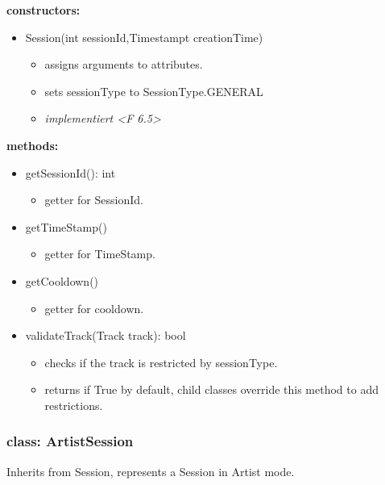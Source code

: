 \documentclass[oneside, ngerman]{sdqtechreport}
\begin{document}
\textbf{constructors:}
\begin{itemize}
    \item Session(int sessionId,Timestampt creationTime)
    \begin{itemize}
        \item assigns arguments to attributes.
        \item sets sessionType to SessionType.GENERAL
        \item \textit{implementiert <F 6.5>}
    \end{itemize}
\end{itemize}
\textbf{methods:}
\begin{itemize}
    \item getSessionId(): int
    \begin{itemize}
        \item getter for SessionId.
    \end{itemize}
    \item getTimeStamp()
    \begin{itemize}
        \item getter for TimeStamp.
    \end{itemize}
    \item getCooldown()
    \begin{itemize}
        \item getter for cooldown.
    \end{itemize}
    \item validateTrack(Track track): bool 
    \begin{itemize}
        \item checks if the track is restricted by sessionType.  
        \item returns if True by default, child classes override this method to add restrictions.
    \end{itemize}
    
\end{itemize}

\subsubsection{class: ArtistSession}
Inherits from Session, represents a Session in Artist mode.
\end{document}
